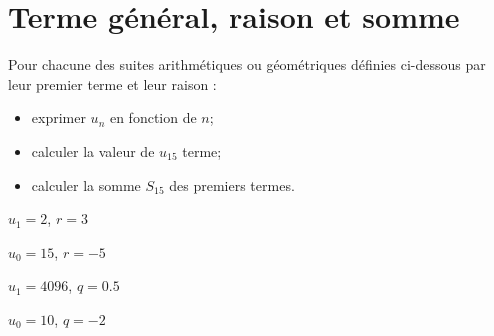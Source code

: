 %	
%	
%	
%	
%	


\section{Terme général, raison et somme}

Pour chacune des suites arithmétiques ou géométriques définies ci-dessous par leur premier terme et leur raison :
\begin{itemize}
	\item exprimer $u_n$ en fonction de $n$;
	\item calculer la valeur de $u_{15}$ terme;
	\item calculer la somme $S_{15}$ des premiers termes.
	
\end{itemize} 
\begin{questions}
	
	
	\question[2\half] $u_1 = 2$, $r= 3$
	
	\fillwithdottedlines{8cm}
	
	
	\question[2\half] $u_0 = 15$, $r= -5$
	
	\fillwithdottedlines{8cm}
	
	\question[2\half] $u_1 = 4096$, $q=\num{0.5}$
	
	\fillwithdottedlines{9cm}
	
	\question[2\half] $u_0 = 10$, $q=\num{-2}$
	
	\fillwithdottedlines{9cm}
\end{questions}

